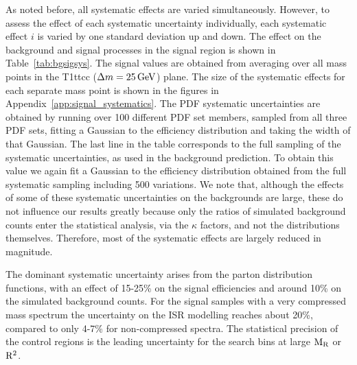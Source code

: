 As noted before, all systematic effects are varied simultaneously. However, to assess the
effect of each systematic uncertainty individually, each systematic effect $i$ is varied by one
standard deviation up and down.  
The effect on the background and signal processes in the signal region is shown in
Table~\ref{tab:bgsigsys}.  
The signal values are obtained from averaging over all mass points in the T1ttcc ($\Delta m =
25\,\text{Ge\hspace{-.08em}V}$) plane.  
The size of the systematic effects for each separate mass point is shown in the figures in 
Appendix~\ref{app:signal_systematics}. 
The PDF systematic uncertainties are obtained by running
over 100 different PDF set members, sampled from all three PDF sets, fitting a Gaussian
to the efficiency distribution and taking the
width of that Gaussian.  
The last line in the table corresponds to the full sampling of the systematic uncertainties, as
used in the background prediction. To obtain this value we again fit a Gaussian to the efficiency
distribution obtained from the full systematic sampling including 500 variations.  We note that,
although the effects of some of these systematic uncertainties on the backgrounds are large, these
do not influence our results greatly because only the  ratios of simulated background counts enter
the statistical analysis, via the $\kappa$ factors, and not the distributions themselves. 
Therefore, most of the systematic effects are largely reduced in magnitude. 

The dominant systematic uncertainty arises from the parton distribution functions, with an effect
of 15-25\% on the signal efficiencies and around 10\% on the simulated background counts. For the
signal samples with a very compressed mass spectrum the uncertainty on the ISR modelling reaches
about 20\%, compared to only 4-7\% for non-compressed spectra. 
The statistical precision of the control regions is the leading uncertainty for the search bins at
large $\mathrm{M_R}$ or $\mathrm{R^2}$. 

 

